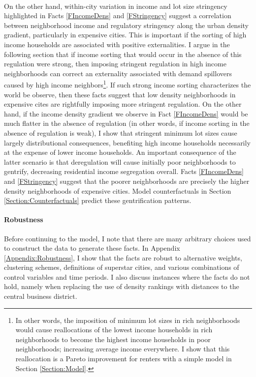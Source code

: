 \documentclass[11pt]{article}
\begin{document}
	\paragraph*{}
	On the other hand, within-city variation in income and lot size stringency highlighted in Facts \ref{FIncomeDens} and \ref{FStringency} suggest a correlation between neighborhood income and regulatory stringency along the urban density gradient, particularly in expensive cities. This is important if the sorting of high income households are associated with positive externalities. I argue in the following section that if income sorting that would occur in the absence of this regulation were strong, then imposing stringent regulation in high income neighborhoods can correct an externality associated with demand spillovers caused by high income neighbors\footnote{In other words, the imposition of minimum lot sizes in rich neighborhoods would cause reallocations of the lowest income households in rich neighborhoods to become the highest income households in poor neighborhoods; increasing average income everywhere. I show that this reallocation is a Pareto improvement for renters with a simple model in Section \ref{Section:Model}.}. If such strong income sorting characterizes the world be observe, then these facts suggest that low density neighborhoods in expensive cites are rightfully imposing more stringent regulation. On the other hand, if the income density gradient we observe in Fact \ref{FIncomeDens} would be much flatter in the absence of regulation (in other words, if income sorting in the absence of regulation is weak), I show that stringent minimum lot sizes cause largely distributional consequences, benefiting high income households necessarily at the expense of lower income households. An important consequence of the latter scenario is that deregulation will cause initially poor neighborhoods to gentrify, decreasing residential income segregation overall. Facts \ref{FIncomeDens} and \ref{FStringency} suggest that the poorer neighborhoods are precisely the higher density neighborhoods of expensive cities. Model counterfactuals in Section \ref{Section:Counterfactuals} predict these gentrification patterns.
	
	\paragraph*{Robustness}
	Before continuing to the model, I note that there are many arbitrary choices used to construct the data to generate these facts. In Appendix \ref{Appendix:Robustness}, I show that the facts are robust to alternative weights, clustering schemes, definitions of superstar cities, and various combinations of control variables and time periods. I also discuss instances where the facts do not hold, namely when replacing the use of density rankings with distances to the central business district.  
	
\end{document}
